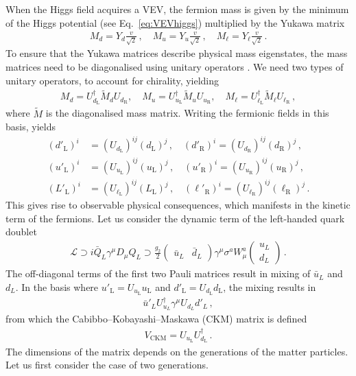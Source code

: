 When the Higgs field acquires a VEV, the fermion mass is given by the minimum of the Higgs potential (see Eq.~\eqref{eq:VEVhiggs}) multiplied by the Yukawa matrix
\begin{align}
    M_d = Y_d \frac{v}{\sqrt{2}}\,, \quad M_u = Y_u \frac{v}{\sqrt{2}}\,, \quad M_\ell = Y_\ell \frac{v}{\sqrt{2}}\,.
\end{align}
To ensure that the Yukawa matrices describe physical mass eigenstates, the mass matrices need to be diagonalised using unitary operators \cite{Pernow:2021fvb}. We need two types of unitary operators, to account for chirality, yielding
\begin{align}
    M_d = U_{d_{\mathrm{L}}}^\dagger \tilde{M}_d U_{d_{\mathrm{R}}}, \quad M_u = U_{u_{\mathrm{L}}}^\dagger \tilde{M}_u U_{u_{\mathrm{R}}}, \quad M_\ell = U_{\ell_{\mathrm{L}}}^\dagger \tilde{M}_\ell U_{\ell_{\mathrm{R}}}\,,
\end{align}
where $\tilde{M}$ is the diagonalised mass matrix. Writing the fermionic fields in this basis, yields 
\begin{align}
(d'_{\mathrm{L}})^i &= (U_{d_{\mathrm{L}}})^{ij}(d_{\mathrm{L}})^j\,, \quad (d'_{\mathrm{R}})^i = (U_{d_{\mathrm{R}}})^{ij}(d_{\mathrm{R}})^j\,, \\
(u'_{\mathrm{L}})^i &= (U_{u_{\mathrm{L}}})^{ij}(u_{\mathrm{L}})^j\,, \quad (u'_{\mathrm{R}})^i = (U_{u_{\mathrm{R}}})^{ij}(u_{\mathrm{R}})^j\,, \\
(L'_{\mathrm{L}})^i &= (U_{\ell_{\mathrm{L}}})^{ij}(L_{\mathrm{L}})^j\,, \quad (\ell'_{\mathrm{R}})^i = (U_{\ell_{\mathrm{R}}})^{ij}(\ell_{\mathrm{R}})^j\,.
\end{align}
This gives rise to observable physical consequences, which manifests in the kinetic term of the fermions. Let us consider the dynamic term of the left-handed quark doublet
\begin{align}
    \mathcal{L} \supset i \bar{Q}_L \gamma^\mu D_\mu Q_L \supset \frac{g_2}{2} \begin{pmatrix} \bar{u}_L & \bar{d}_L \end{pmatrix} \gamma^\mu \sigma^a W_\mu^a \begin{pmatrix} u_L \\ d_L \end{pmatrix}\,.
\end{align} 
The off-diagonal terms of the first two Pauli matrices result in mixing of $\bar{u}_L$ and $d_L$. In the basis where $u'_\mathrm{L}=U_{u_{\mathrm{L}}}u_\mathrm{L}$ and $d'_\mathrm{L}=U_{d_{\mathrm{L}}}d_\mathrm{L}$, the mixing results in 
\begin{align}
    \bar{u}'_L U^\dagger_{u_L} \gamma^\mu U_{d_L} d'_L \,,\label{eq:CKMLterm}
\end{align}
from which the Cabibbo--Kobayashi--Maskawa (CKM) matrix \cite{Cabibbo:1963yz,Kobayashi:1973fv} is defined
\begin{align}
    V_{\mathrm{CKM}} = U_{u_{\mathrm{L}}} U_{d_{\mathrm{L}}}^\dagger\,.
\end{align}
The dimensions of the matrix depends on the generations of the matter particles. Let us first consider the case of two generations. 

